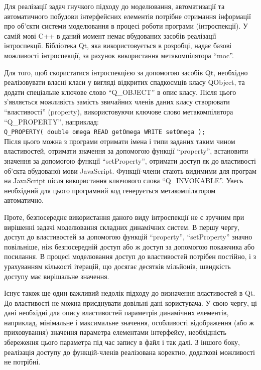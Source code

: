 Для реалізації задач гнучкого підходу до моделювання,
автоматизації та автоматичного побудови інтерфейсних елементів
потрібне отримання інформації про об'єкти системи моделювання
в процесі роботи програми (інтроспекції). У самій мові C++ в
даний момент немає вбудованих засобів реалізації інтроспекції. Бібліотека
Qt, яка використовується в розробці, надає базові можливості
інтроспекції, за рахунок використання метакомпілятора ``moc''.

Для того, щоб скористатися інтроспекцією за допомогою засобів
Qt, необхідно реалізовувати власні класи у вигляді відкритих
спадкоємців класу QObject, та додати спеціальне ключове слово ``Q\_OBJECT''
в опис класу. Після цього з'являється можливість замість
звичайних членів даних класу створювати ``властивості'' (property),
використовуючи ключове слово метакомпілятора ``Q\_PROPERTY'',
наприклад:\\
\verb!Q_PROPERTY( double omega READ getOmega WRITE setOmega );!\\
Після цього можна з програми отримати імена і типи заданих таким
чином властивостей, отримати значення за допомогою функції
``property'', встановити значення за допомогою функції ``setProperty'',
отримати доступ як до властивості об'єкта вбудованої мови
JavaScript. Функції-члени стають видимими для програм на JavaScript після
використання ключового слова ``Q\_INVOKABLE''. Увесь необхідний для
цього програмний код генерується метакомпілятором автоматично.

Проте, безпосереднє використання даного виду інтроспекції не є
зручним при вирішенні задачі моделювання складних динамічних систем. В
першу чергу, доступ до властивостей за допомогою функцій
``property'', ``setProperty'' значно повільніше, ніж безпосередній доступ
або ж доступ за допомогою покажчика або посилання. В процесі
моделювання доступ до властивостей потрібен постійно, і з
урахуванням кількості ітерацій, що досягає десятків мільйонів,
швидкість доступу має вирішальне значення.

Існує також ще один важливий недолік підходу до визначення
властивостей в Qt. До властивості не можна приєднувати довільні
дані користувача. У свою чергу, ці дані необхідні для опису
властивостей параметрів динамічних елементів, наприклад,
мінімальне і максимальне значення, особливості відображення
(або ж приховування) значення параметра елементами інтерфейсу,
необхідність збереження цього параметра під час запису в файл
і так далі. З іншого боку, реалізація доступу до функцій-членів
реалізована коректно, додаткові можливості не потрібні.

